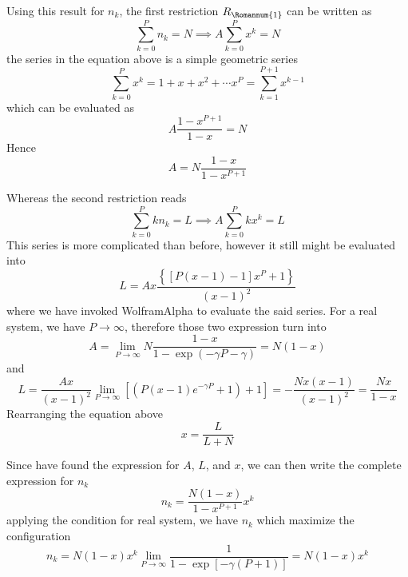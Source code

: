 \documentclass[../../../Main.tex]{subfiles}
\begin{document}
Using this result for $n_k$, the first restriction $R_\Romannum{1}$ can be written as
\begin{equation*}
    \sum_{k=0}^{P}n_k=N\implies A\sum_{k=0}^{P}x^k=N
\end{equation*}
the series in the equation above is a simple geometric series
\begin{equation*}
    \sum_{k=0}^{P}x^k=1+x+x^2+\cdots x^P=\sum_{k=1}^{P+1}x^{k-1}
\end{equation*}
which can be evaluated as 
\begin{equation*}
    A\frac{1-x^{P+1}}{1-x}=N
\end{equation*}
Hence 
\begin{equation*}
    A=N\frac{1-x}{1-x^{P+1}}
\end{equation*}

Whereas the second restriction reads
\begin{equation*}
    \sum_{k=0}^{P}kn_k=L\implies A\sum_{k=0}^{P}kx^k=L
\end{equation*}
This series is more complicated than before, however it still might be evaluated into 
\begin{equation*}
    L=Ax\frac{\left\{\left[P\left(x-1\right)-1\right]x^P+1\right\}}{(x-1)^2}
\end{equation*}  
where we have invoked WolframAlpha to evaluate the said series. For a real\textsuperscript{\texttrademark} system, we have $P\rightarrow\infty $, therefore those two expression turn into
\begin{equation*}
    A=\lim_{P\rightarrow\infty}N\frac{1-x}{1-\exp (-\gamma P-\gamma)}=N(1-x)
\end{equation*}  
and
\begin{equation*} 
    L=\frac{Ax}{(x-1)^2}\lim_{P\rightarrow\infty}\left[(P(x-1)e^{-\gamma P}+1)+1\right]=-\frac{Nx(x-1)}{(x-1)^2}=\frac{Nx}{1-x}
\end{equation*}
Rearranging the equation above 
\begin{equation*}
    x=\frac{L}{L+N}
\end{equation*}

Since have found the expression for $A$, $L$, and $x$, we can then write the complete expression for $n_k$
\begin{equation*}
    n_k=\frac{N(1-x)}{1-x^{P+1}}x^k
\end{equation*}
applying the condition for real system, we have $n_k$ which maximize the configuration
\begin{equation*}
    n_k=N(1-x)x^k\lim_{P\rightarrow\infty}\frac{1}{1-\exp\left[-\gamma (P+1)\right]}=N(1-x)x^k
\end{equation*}
\end{document}
